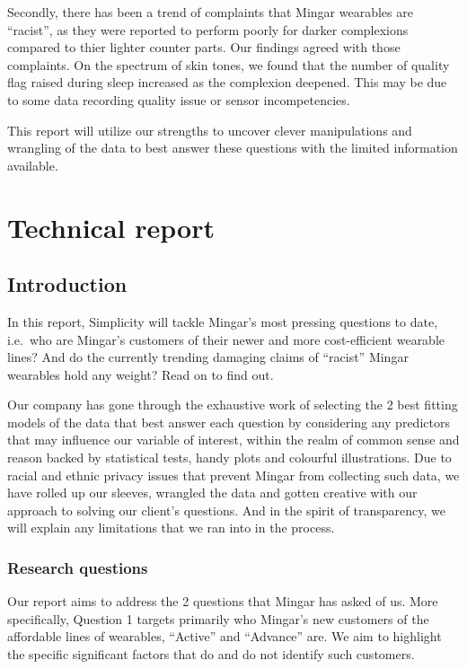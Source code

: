 \documentclass[
          english,
          paper=a4,
              ,captions=tableheading
  ]{scrartcl}
\begin{document}
Secondly, there has been a trend of complaints that Mingar wearables are
``racist'', as they were reported to perform poorly for darker
complexions compared to thier lighter counter parts. Our findings agreed
with those complaints. On the spectrum of skin tones, we found that the
number of quality flag raised during sleep increased as the complexion
deepened. This may be due to some data recording quality issue or sensor
incompetencies.

This report will utilize our strengths to uncover clever manipulations
and wrangling of the data to best answer these questions with the
limited information available.

\newpage

\hypertarget{technical-report}{%
\section{Technical report}\label{technical-report}}

\hypertarget{introduction}{%
\subsection{Introduction}\label{introduction}}

In this report, Simplicity will tackle Mingar's most pressing questions
to date, i.e.~who are Mingar's customers of their newer and more
cost-efficient wearable lines? And do the currently trending damaging
claims of ``racist'' Mingar wearables hold any weight? Read on to find
out.

Our company has gone through the exhaustive work of selecting the 2 best
fitting models of the data that best answer each question by considering
any predictors that may influence our variable of interest, within the
realm of common sense and reason backed by statistical tests, handy
plots and colourful illustrations. Due to racial and ethnic privacy
issues that prevent Mingar from collecting such data, we have rolled up
our sleeves, wrangled the data and gotten creative with our approach to
solving our client's questions. And in the spirit of transparency, we
will explain any limitations that we ran into in the process.

\hypertarget{research-questions}{%
\subsubsection{Research questions}\label{research-questions}}

Our report aims to address the 2 questions that Mingar has asked of us.
More specifically, Question 1 targets primarily who Mingar's new
customers of the affordable lines of wearables, ``Active'' and
``Advance'' are. We aim to highlight the specific significant factors
that do and do not identify such customers.
\end{document}
